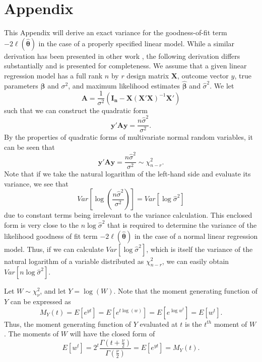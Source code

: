 \documentclass[submit]{smj}
\begin{document}
\section*{Appendix}
This Appendix will derive an exact variance for the goodness-of-fit term $-2 \ell (\hat{\bm{\theta}} )$ in the case of a properly specified
linear model. While a similar derivation has been presented in other work \citep{McQuarrie}, the following derivation differs substantially and is presented for completeness.
We assume that a given linear regression model has a full rank $n$ by $r$ design matrix $\bm{X}$, outcome vector $y$, true parameters $\bm{\beta}$ and $\sigma^2$,
and maximum likelihood estimates $\hat{\bm{\beta}}$ and $\hat{\sigma}^2$. We let
\begin{equation*}
	\bm{A} = \frac{1}{\sigma^2} (\bm{I_n} - \bm{X}(\bm{X}'\bm{X})^{-1}\bm{X}') 
\end{equation*}
such that we can construct the quadratic form
\begin{equation*}
	\bm{y'Ay} = \frac{n \hat{\sigma}^2}{\sigma^2} .
\end{equation*}
By the properties of quadratic forms of multivariate normal random variables, it can be seen that
\begin{equation}
	\bm{y'Ay} = \frac{n \hat{\sigma}^2}{\sigma^2} \sim \chi^2_{n-r} .
\end{equation}
Note that if we take the natural logarithm of the left-hand side and evaluate its variance, we see that
\begin{equation}
	Var \left[ \log(\frac{n \hat{\sigma}^2}{\sigma^2}) \right]  = Var \left[ \log \hat{\sigma}^2 \right]
\end{equation}
due to constant terms being irrelevant to the variance calculation. This enclosed form is very close to the $n \log \hat{\sigma}^2$ that is required
to determine the variance of the likelihood goodness of fit term $-2 \ell (\hat{\bm{\theta}} )$ in the case of a normal linear regression model.
Thus, if we can calculate $Var \left[ \log \hat{\sigma}^2 \right]$, which is itself the variance
of the natural logarithm of a variable distributed as $\chi^2_{n-r}$, we can easily obtain $Var \left[ n \log \hat{\sigma}^2 \right]$.

Let $W \sim \chi^2_{\nu}$, and let $Y = \log(W)$. Note that the moment generating function of $Y$ can be expressed as
\begin{equation*}
	M_Y (t) = E \left[ e^{yt} \right] = E \left[ e^{t\log(w)} \right] = E \left[ e^{\log w^t} \right] = E \left[ w^t \right] .
\end{equation*}
Thus, the moment generating function of $Y$ evaluated at $t$ is the $t^{th}$ moment of $W$. The moments of $W$ will have the
closed form of
\begin{equation*}
	E \left[ w^t \right] = 2^t \frac{\Gamma (t + \frac{\nu}{2})}{\Gamma (\frac{\nu}{2})} = E \left[ e^{yt} \right] = M_Y (t) .
\end{equation*}
\end{document}
